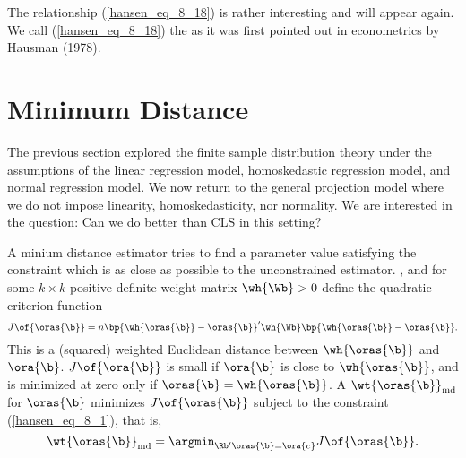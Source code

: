 The relationship (\ref{hansen_eq_8_18}) is rather interesting and will appear again.  We call (\ref{hansen_eq_8_18}) the  as it was first pointed out in econometrics by Hausman (1978).

\section{Minimum Distance}

The previous section explored the finite sample distribution theory under the assumptions of the linear regression model, homoskedastic regression model, and normal regression model. We now return to the general projection model where we do not impose linearity, homoskedasticity, nor normality. We are interested in the question: Can we do better than CLS in this setting?

A minium distance estimator tries to find a parameter value satisfying the constraint which is as close as possible to the unconstrained estimator. , and for some $k \times k$ positive definite weight matrix $\wh{\Wb} > 0$ define the quadratic criterion function
\begin{equation}
    \label{hansen_eq_8_19}
    J\of{\oras{\b}} = n \bp{\wh{\oras{\b}} - \oras{\b}}^{\prime} \wh{\Wb} \bp{\wh{\oras{\b}} - \oras{\b}}.
\end{equation}
This is a (squared) weighted Euclidean distance between $\wh{\oras{\b}}$ and $\ora{\b}$. $J\of{\ora{\b}}$ is small if $\ora{\b}$ is close to $\wh{\oras{\b}}$, and is minimized at zero only if $\oras{\b} = \wh{\oras{\b}}$. A  $\wt{\oras{\b}}_{\text{md}}$ for $\oras{\b}$ minimizes $J\of{\oras{\b}}$ subject to the constraint (\ref{hansen_eq_8_1}), that is, 
\begin{equation}
    \notag 
    \wt{\oras{\b}}_{\text{md}} = \argmin_{\Rb^{\prime} \oras{\b} = \ora{c}} J\of{\oras{\b}}.
\end{equation}

